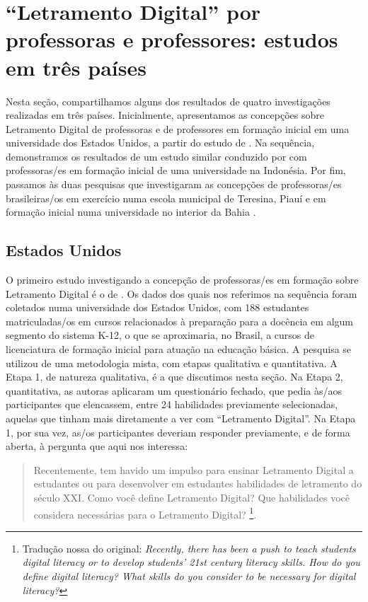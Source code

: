 \documentclass[portuguese]{textolivre}
\begin{document}
\section{“Letramento Digital” por professoras e professores: estudos em três países}

Nesta seção, compartilhamos alguns dos resultados de quatro investigações realizadas em três países. Inicialmente, apresentamos as concepções sobre Letramento Digital de professoras e de professores em formação inicial em uma universidade dos Estados Unidos, a partir do estudo de \textcite{list_framework_2020}. Na sequência, demonstramos os resultados de um estudo similar conduzido por \textcite{nabhan_pre-service_2021} com professoras/es em formação inicial de uma universidade na Indonésia. Por fim, passamos às duas pesquisas que investigaram as concepções de professoras/es brasileiras/os em exercício numa escola municipal de Teresina, Piauí \cite{santos_o_2017} e em formação inicial numa universidade no interior da Bahia \cite{_santos_letramento_2018}.

\subsection{Estados Unidos \cite{list_framework_2020}}

O primeiro estudo investigando a concepção de professoras/es em formação sobre Letramento Digital é o de \textcite{list_framework_2020}. Os dados dos quais nos referimos na sequência foram coletados numa universidade dos Estados Unidos, com 188 estudantes matriculadas/os em cursos relacionados à preparação para a docência em algum segmento do sistema K-12, o que se aproximaria, no Brasil, a cursos de licenciatura de formação inicial para atuação na educação básica. A pesquisa se utilizou de uma metodologia mista, com etapas qualitativa e quantitativa.
A Etapa 1, de natureza qualitativa, é a que discutimos nesta seção. Na Etapa 2, quantitativa, as autoras aplicaram um questionário fechado, que pedia às/aos participantes que elencassem, entre 24 habilidades previamente selecionadas, aquelas que tinham mais diretamente a ver com “Letramento Digital”. Na Etapa 1, por sua vez, as/os participantes deveriam responder previamente, e de forma aberta, à pergunta que aqui nos interessa:

\begin{quote}
   Recentemente, tem havido um impulso para ensinar Letramento Digital a estudantes ou para desenvolver em estudantes habilidades de letramento do século XXI. Como você define Letramento Digital? Que habilidades você considera necessárias para o Letramento Digital? \cite[p.~4]{list_framework_2020}\footnote{Tradução nossa do original: \textit{Recently, there has been a push to teach students digital literacy or to develop students’ 21st century literacy skills. How do you define digital literacy? What skills do you consider to be necessary for digital literacy?}}. 
\end{quote}
\end{document}

